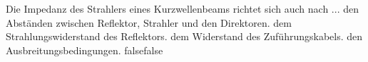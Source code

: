     {Die Impedanz des Strahlers eines Kurzwellenbeams richtet sich auch nach ...}
    {den Abständen zwischen Reflektor, Strahler und den Direktoren.}
    {dem Strahlungswiderstand des Reflektors.}
    {dem Widerstand des Zuführungskabels.}
    {den Ausbreitungsbedingungen.}
    {false}{false}